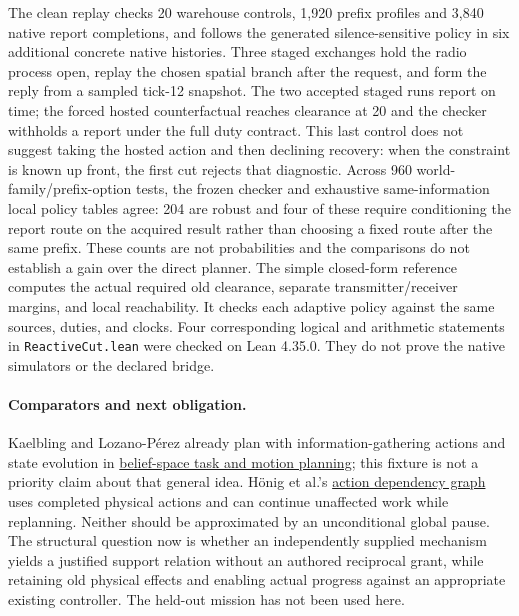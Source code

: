 \documentclass[11pt]{article}
\begin{document}
The clean replay checks 20 warehouse controls, 1,920 prefix profiles and
3,840 native report completions, and follows the generated
silence-sensitive policy in six additional concrete native histories.
Three staged exchanges hold the radio process open, replay the chosen
spatial branch after the request, and form the reply from a sampled
tick-12 snapshot. The two accepted staged runs report on time; the
forced hosted counterfactual reaches clearance at 20 and the checker
withholds a report under the full duty contract. This last control
does not suggest taking the hosted action and then declining recovery:
when the constraint is known up front, the first cut rejects that
diagnostic.
Across 960 world-family/prefix-option tests, the frozen checker and
exhaustive same-information local policy tables agree: 204 are robust
and four of these require conditioning the report route on the acquired
result rather than choosing a fixed route after the same prefix. These
counts are not probabilities and the comparisons do not establish a
gain over the direct planner. The simple closed-form reference computes
the actual required old clearance, separate transmitter/receiver
margins, and local reachability. It checks each adaptive policy against
the same sources, duties, and clocks. Four corresponding logical and
arithmetic statements in \texttt{ReactiveCut.lean} were checked on Lean
4.35.0. They do not prove the native simulators or the declared bridge.

\paragraph{Comparators and next obligation.}
Kaelbling and Lozano-P\'erez already plan with information-gathering
actions and state evolution in
\href{https://lis.csail.mit.edu/pubs/tlp/IJRRBelFinal.pdf}{belief-space
task and motion planning}; this fixture is not a priority claim about
that general idea. H\"onig et al.'s
\href{https://whoenig.github.io/publications/2019_RA-L_Hoenig.pdf}{action
dependency graph} uses completed physical actions and can continue
unaffected work while replanning. Neither should be approximated by an
unconditional global pause. The structural question now is whether an
independently supplied mechanism yields a justified support relation
without an authored reciprocal grant, while retaining old physical
effects and enabling actual progress against an appropriate existing
controller. The held-out mission has not been used here.
\end{document}
